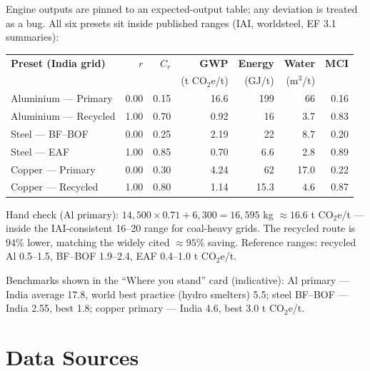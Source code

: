 \documentclass[11pt,a4paper]{article}
\begin{document}
Engine outputs are pinned to an expected-output table; any deviation is treated as a bug.
All six presets sit inside published ranges (IAI, worldsteel, EF 3.1 summaries):

\begin{center}
\begin{tabular}{@{}lrrrrrr@{}}
\toprule
\textbf{Preset (India grid)} & $r$ & $C_r$ & \textbf{GWP} & \textbf{Energy} & \textbf{Water} & \textbf{MCI} \\
 & & & (t CO$_2$e/t) & (GJ/t) & (m$^3$/t) & \\
\midrule
Aluminium --- Primary  & 0.00 & 0.15 & 16.6 & 199  & 66   & 0.16 \\
Aluminium --- Recycled & 1.00 & 0.70 & 0.92 & 16   & 3.7  & 0.83 \\
Steel --- BF--BOF      & 0.00 & 0.25 & 2.19 & 22   & 8.7  & 0.20 \\
Steel --- EAF          & 1.00 & 0.85 & 0.70 & 6.6  & 2.8  & 0.89 \\
Copper --- Primary     & 0.00 & 0.30 & 4.24 & 62   & 17.0 & 0.22 \\
Copper --- Recycled    & 1.00 & 0.80 & 1.14 & 15.3 & 4.6  & 0.87 \\
\bottomrule
\end{tabular}
\end{center}

Hand check (Al primary): $14{,}500 \times 0.71 + 6{,}300 = 16{,}595$ kg $\approx 16.6$ t
CO$_2$e/t --- inside the IAI-consistent 16--20 range for coal-heavy grids. The recycled
route is $94\%$ lower, matching the widely cited $\approx 95\%$ saving. Reference ranges:
recycled Al 0.5--1.5, BF--BOF 1.9--2.4, EAF 0.4--1.0 t CO$_2$e/t.

Benchmarks shown in the ``Where you stand'' card (indicative): Al primary --- India average
17.8, world best practice (hydro smelters) 5.5; steel BF--BOF --- India 2.55, best 1.8;
copper primary --- India 4.6, best 3.0 t CO$_2$e/t.

\section{Data Sources}
\end{document}
